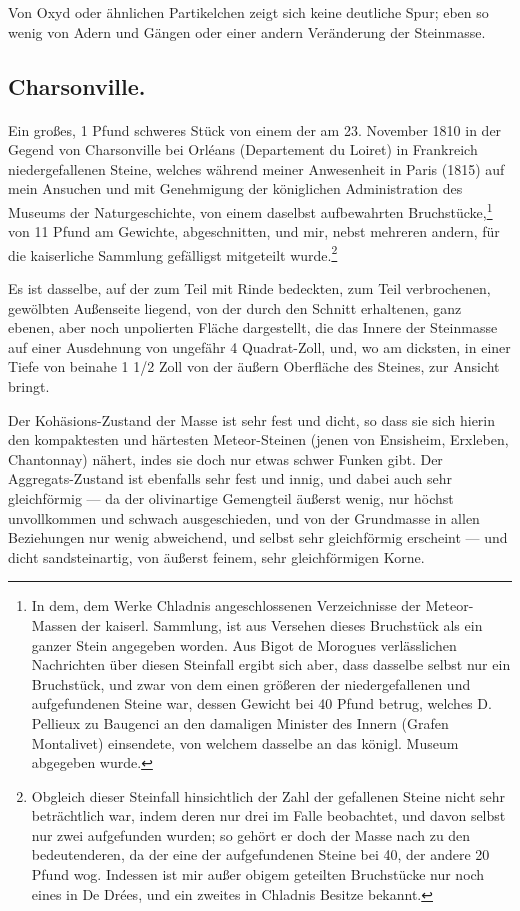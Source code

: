 \documentclass[a4paper, 11pt, oneside, german]{article}
\begin{document}
Von Oxyd oder ähnlichen Partikelchen zeigt sich keine deutliche Spur; eben so wenig von Adern und Gängen oder einer andern Veränderung der Steinmasse.

\subsection{Charsonville.}
\paragraph{}
Ein großes, 1 Pfund schweres Stück von einem der am 23. November 1810 in der Gegend von Charsonville bei Orléans (Departement du Loiret) in Frankreich niedergefallenen Steine, welches während meiner Anwesenheit in Paris (1815) auf mein Ansuchen und mit Genehmigung der königlichen Administration des Museums der Naturgeschichte, von einem daselbst aufbewahrten Bruchstücke,\footnote{In dem, dem Werke Chladnis angeschlossenen Verzeichnisse der Meteor-Massen der kaiserl. Sammlung, ist aus Versehen dieses Bruchstück als ein ganzer Stein angegeben worden. Aus Bigot de Morogues verlässlichen Nachrichten über diesen Steinfall ergibt sich aber, dass dasselbe selbst nur ein Bruchstück, und zwar von dem einen größeren der niedergefallenen und aufgefundenen Steine war, dessen Gewicht bei 40 Pfund betrug, welches D. Pellieux zu Baugenci an den damaligen Minister des Innern (Grafen Montalivet) einsendete, von welchem dasselbe an das königl. Museum abgegeben wurde.} von 11 Pfund am Gewichte, abgeschnitten, und mir, nebst mehreren andern, für die kaiserliche Sammlung gefälligst mitgeteilt wurde.\footnote{Obgleich dieser Steinfall hinsichtlich der Zahl der gefallenen Steine nicht sehr beträchtlich war, indem deren nur drei im Falle beobachtet, und davon selbst nur zwei aufgefunden wurden; so gehört er doch der Masse nach zu den bedeutenderen, da der eine der aufgefundenen Steine bei 40, der andere 20 Pfund wog. Indessen ist mir außer obigem geteilten Bruchstücke nur noch eines in De Drées, und ein zweites in Chladnis Besitze bekannt.}

Es ist dasselbe, auf der zum Teil mit Rinde bedeckten, zum Teil verbrochenen, gewölbten Außenseite liegend, von der durch den Schnitt erhaltenen, ganz ebenen, aber noch unpolierten Fläche dargestellt, die das Innere der Steinmasse auf einer Ausdehnung von ungefähr 4 Quadrat-Zoll, und, wo am dicksten, in einer Tiefe von beinahe 1 1/2 Zoll von der äußern Oberfläche des Steines, zur Ansicht bringt.

Der Kohäsions-Zustand der Masse ist sehr fest und dicht, so dass sie sich hierin den kompaktesten und härtesten Meteor-Steinen (jenen von Ensisheim, Erxleben, Chantonnay) nähert, indes sie doch nur etwas schwer Funken gibt. Der Aggregats-Zustand ist ebenfalls sehr fest und innig, und dabei auch sehr gleichförmig --- da der olivinartige Gemengteil äußerst wenig, nur höchst unvollkommen und schwach ausgeschieden, und von der Grundmasse in allen Beziehungen nur wenig abweichend, und selbst sehr gleichförmig erscheint --- und dicht sandsteinartig, von äußerst feinem, sehr gleichförmigen Korne.
\end{document}
